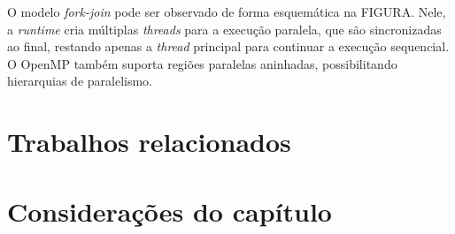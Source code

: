 O modelo \textit{fork-join} pode ser observado de forma esquemática na FIGURA. Nele, a \textit{runtime} cria múltiplas \textit{threads} para a execução paralela, que são sincronizadas ao final, restando apenas a \textit{thread} principal para continuar a execução sequencial. O OpenMP também suporta regiões paralelas aninhadas, possibilitando hierarquias de paralelismo.

\section{Trabalhos relacionados}\label{sec:trabRelac}

\section{Considerações do capítulo}
